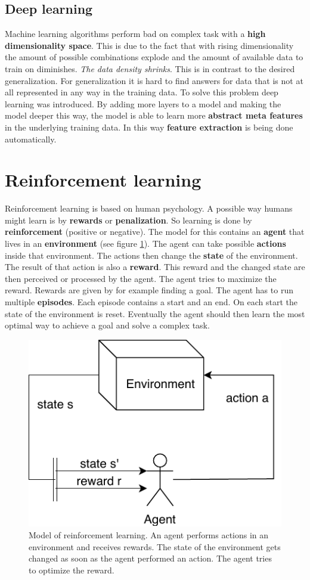 \documentclass[jou,apacite]{apa6}
\begin{document}
\subsection{Deep learning}
Machine learning algorithms perform bad on complex task with a \textbf{high dimensionality space}. This is due to the fact that with rising dimensionality the amount of possible combinations explode and the amount of available data to train on diminishes. \textit{The data density shrinks}. This is in contrast to the desired generalization. For generalization it is hard to find answers for data that is not at all represented in any way in the training data. To solve this problem deep learning was introduced. By adding more layers to a model and making the model deeper this way, the model is able to  learn more \textbf{abstract meta features} in the underlying training data. In this way \textbf{feature extraction} is being done automatically.

\section{Reinforcement learning}
Reinforcement learning is based on human psychology. A possible way humans might learn is by \textbf{rewards} or \textbf{penalization}. So learning is done by \textbf{reinforcement} (positive or negative). The model for this contains an \textbf{agent} that lives in an \textbf{environment} (see figure \ref{fig:reinforcement-learning}). The agent can take possible \textbf{actions} inside that environment. The actions then change the \textbf{state} of the environment. The result of that action is also a \textbf{reward}. This reward and the changed state are then perceived or processed by the agent. The agent tries to maximize the reward. Rewards are given by for example finding a goal. The agent has to run multiple \textbf{episodes}. Each episode contains a start and an end. On each start the state of the environment is reset. Eventually the agent should then learn the most optimal way to achieve a goal and solve a complex task.

\begin{figure}[!htb]
\centering
\includegraphics[width=.3\textwidth]{reinforcement-learning.pdf}
\caption[Model of reinforcement learning]{Model of reinforcement learning. An agent performs actions in an environment and receives rewards. The state of the environment gets changed as soon as the agent performed an action. The agent tries to optimize the reward.}
\label{fig:reinforcement-learning}
\end{figure}
\end{document}
